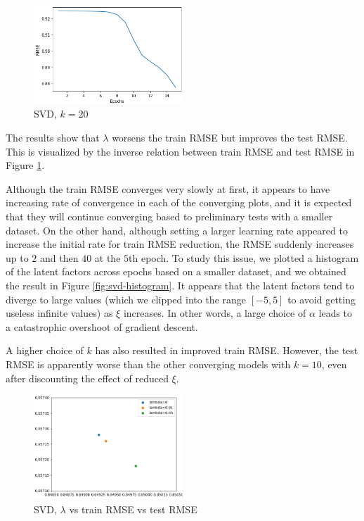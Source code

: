 \documentclass[final]{cvpr}
\begin{document}
\begin{figure}[h]
	\includegraphics[width=0.5\textwidth]{screenshot20210504230954.png}
	\caption{SVD, $k=20$}
\end{figure}

The results show that $\lambda$ worsens the train RMSE but improves the test RMSE.
This is visualized by the inverse relation between train RMSE and test RMSE
in Figure \ref{fig:svd-train-test-lambda}.

Although the train RMSE converges very slowly at first,
it appears to have increasing rate of convergence
in each of the converging plots,
and it is expected that they will continue converging
based to preliminary tests with a smaller dataset.
On the other hand, although setting a larger learning rate
appeared to increase the initial rate for train RMSE reduction,
the RMSE suddenly increases up to $2$ and then $40$ at the $5$th epoch.
To study this issue, we plotted a histogram of the latent factors across epochs
based on a smaller dataset, and we obtained the result in Figure \ref{fig:svd-histogram}.
It appears that the latent factors tend to diverge to large values
(which we clipped into the range $[-5, 5]$ to avoid getting useless infinite values)
as $\xi$ increases.
In other words, a large choice of $\alpha$ leads to a catastrophic overshoot of gradient descent.

A higher choice of $k$ has also resulted in improved train RMSE.
However, the test RMSE is apparently worse than the other converging models with $k=10$,
even after discounting the effect of reduced $\xi$.

\begin{figure}[h]
	\includegraphics[width=0.5\textwidth]{screenshot20210504232929.png}
	\caption{SVD, $\lambda$ vs train RMSE vs test RMSE}
	\label{fig:svd-train-test-lambda}
\end{figure}
\end{document}
